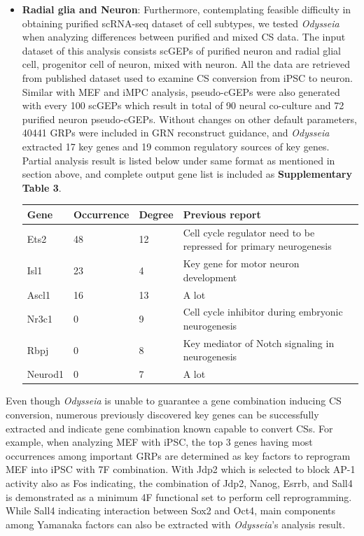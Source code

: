 \documentclass[fleqn,10pt]{wlscirep}
\begin{document}
\begin{itemize}
\item \textbf{Radial glia and Neuron}:
Furthermore, contemplating feasible difficulty in obtaining purified scRNA-seq dataset of cell subtypes, we tested \emph{Odysseia} when analyzing differences between purified and mixed CS data.
The input dataset of this analysis consists scGEPs of purified neuron and radial glial cell, progenitor cell of neuron, mixed with neuron.
All the data are retrieved from published dataset used to examine CS conversion from iPSC to neuron.\cite{ips_neuron_ascl1}
Similar with MEF and iMPC analysis, pseudo-cGEPs were also generated with every 100 scGEPs which result in total of 90 neural co-culture and 72 purified neuron pseudo-cGEPs.
Without changes on other default parameters, 40441 GRPs were included in GRN reconstruct guidance, and \emph{Odysseia} extracted 17 key genes and 19 common regulatory sources of key genes.
Partial analysis result is listed below under same format as mentioned in section above, and complete output gene list is included as \textbf{Supplementary Table 3}.

\begin{table}[ht]
\centering
\begin{tabular}{|l|l|l|l|}
\hline
\textbf{Gene} & \textbf{Occurrence} & \textbf{Degree} & \textbf{Previous report}  \\
\hline
Ets2 & 48 & 12 & Cell cycle regulator need to be repressed for primary neurogenesis\cite{ets2_1, ets2_2} \\
\hline
Isl1 & 23 & 4 & Key gene for motor neuron development\cite{isl1_1, isl1_2011, isl1_repro}\\
\hline
Ascl1 & 16 & 13 & A lot~\cite{ips_neuron_ascl1} \\
\hline
Nr3c1 & 0 & 9 & Cell cycle inhibitor during embryonic neurogenesis\cite{nr3c1}\\
\hline
Rbpj & 0 & 8 & Key mediator of Notch signaling in neurogenesis\cite{rbpj_1, rbpj_2, rbpj_3}\\
\hline
Neurod1 & 0 & 7 & A lot~\cite{ips_neuron_ascl1} \\
\hline
\end{tabular}
\end{table}

\end{itemize}

Even though \emph{Odysseia} is unable to guarantee a gene combination inducing CS conversion, numerous previously discovered key genes can be successfully extracted and indicate gene combination known capable to convert CSs.
For example, when analyzing MEF with iPSC, the top 3 genes having most occurrences among important GRPs are determined as key factors to reprogram MEF into iPSC with 7F combination\cite{ips7f}.
With Jdp2 which is selected to block AP-1 activity also as Fos indicating, the combination of Jdp2, Nanog, Esrrb, and Sall4 is demonstrated as a minimum 4F functional set to perform cell reprogramming\cite{ips7f}.
While Sall4 indicating interaction between Sox2 and Oct4\cite{sall4_oct4_sox2}, main components among Yamanaka factors\cite{yamanaka_2006, osk} can also be extracted with \emph{Odysseia}'s analysis result.
\end{document}
